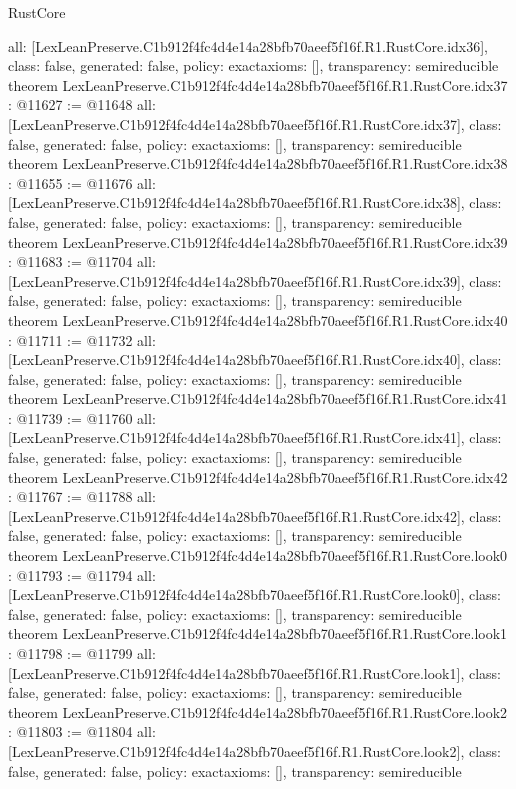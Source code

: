 \begin{lexlean}{RustCore}
\begin{coremodule}
{  all: [LexLeanPreserve.C1b912f4fc4d4e14a28bfb70aeef5f16f.R1.RustCore.idx36],
  class: false,
  generated: false,
  policy: exact{axioms: []},
  transparency: semireducible
}
theorem LexLeanPreserve.C1b912f4fc4d4e14a28bfb70aeef5f16f.R1.RustCore.idx37 : @11627 := @11648 {
  all: [LexLeanPreserve.C1b912f4fc4d4e14a28bfb70aeef5f16f.R1.RustCore.idx37],
  class: false,
  generated: false,
  policy: exact{axioms: []},
  transparency: semireducible
}
theorem LexLeanPreserve.C1b912f4fc4d4e14a28bfb70aeef5f16f.R1.RustCore.idx38 : @11655 := @11676 {
  all: [LexLeanPreserve.C1b912f4fc4d4e14a28bfb70aeef5f16f.R1.RustCore.idx38],
  class: false,
  generated: false,
  policy: exact{axioms: []},
  transparency: semireducible
}
theorem LexLeanPreserve.C1b912f4fc4d4e14a28bfb70aeef5f16f.R1.RustCore.idx39 : @11683 := @11704 {
  all: [LexLeanPreserve.C1b912f4fc4d4e14a28bfb70aeef5f16f.R1.RustCore.idx39],
  class: false,
  generated: false,
  policy: exact{axioms: []},
  transparency: semireducible
}
theorem LexLeanPreserve.C1b912f4fc4d4e14a28bfb70aeef5f16f.R1.RustCore.idx40 : @11711 := @11732 {
  all: [LexLeanPreserve.C1b912f4fc4d4e14a28bfb70aeef5f16f.R1.RustCore.idx40],
  class: false,
  generated: false,
  policy: exact{axioms: []},
  transparency: semireducible
}
theorem LexLeanPreserve.C1b912f4fc4d4e14a28bfb70aeef5f16f.R1.RustCore.idx41 : @11739 := @11760 {
  all: [LexLeanPreserve.C1b912f4fc4d4e14a28bfb70aeef5f16f.R1.RustCore.idx41],
  class: false,
  generated: false,
  policy: exact{axioms: []},
  transparency: semireducible
}
theorem LexLeanPreserve.C1b912f4fc4d4e14a28bfb70aeef5f16f.R1.RustCore.idx42 : @11767 := @11788 {
  all: [LexLeanPreserve.C1b912f4fc4d4e14a28bfb70aeef5f16f.R1.RustCore.idx42],
  class: false,
  generated: false,
  policy: exact{axioms: []},
  transparency: semireducible
}
theorem LexLeanPreserve.C1b912f4fc4d4e14a28bfb70aeef5f16f.R1.RustCore.look0 : @11793 := @11794 {
  all: [LexLeanPreserve.C1b912f4fc4d4e14a28bfb70aeef5f16f.R1.RustCore.look0],
  class: false,
  generated: false,
  policy: exact{axioms: []},
  transparency: semireducible
}
theorem LexLeanPreserve.C1b912f4fc4d4e14a28bfb70aeef5f16f.R1.RustCore.look1 : @11798 := @11799 {
  all: [LexLeanPreserve.C1b912f4fc4d4e14a28bfb70aeef5f16f.R1.RustCore.look1],
  class: false,
  generated: false,
  policy: exact{axioms: []},
  transparency: semireducible
}
theorem LexLeanPreserve.C1b912f4fc4d4e14a28bfb70aeef5f16f.R1.RustCore.look2 : @11803 := @11804 {
  all: [LexLeanPreserve.C1b912f4fc4d4e14a28bfb70aeef5f16f.R1.RustCore.look2],
  class: false,
  generated: false,
  policy: exact{axioms: []},
  transparency: semireducible
}
\end{coremodule}
\end{lexlean}
